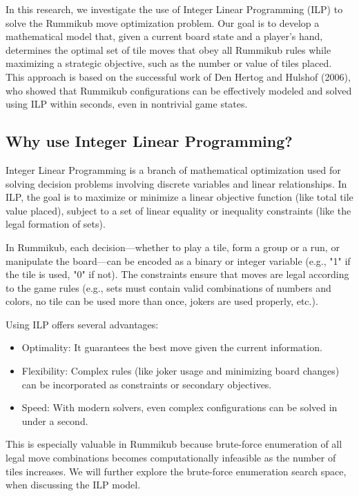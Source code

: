 \documentclass[11pt,letterpaper]{article}
\begin{document}
In this research, we investigate the use of Integer Linear Programming (ILP) to solve the 
Rummikub move optimization problem. Our goal is to develop a mathematical model that, given 
a current board state and a player's hand, determines the optimal set of tile moves that 
obey all Rummikub rules while maximizing a strategic objective, such as the number or 
value of tiles placed. This approach is based on the successful work of Den Hertog and 
Hulshof (2006), who showed that Rummikub configurations can be effectively modeled and 
solved using ILP within seconds, even in nontrivial game states.

\subsection*{Why use Integer Linear Programming?}
Integer Linear Programming is a branch of mathematical optimization used for solving decision
problems involving discrete variables and linear relationships. In ILP, the goal is to 
maximize or minimize a linear objective function (like total tile value placed), subject 
to a set of linear equality or inequality constraints (like the legal formation of sets).

In Rummikub, each decision—whether to play a tile, form a group or a run, or manipulate the 
board—can be encoded as a binary or integer variable (e.g., "1" if the tile is used, "0" if 
not). The constraints ensure that moves are legal according to the game rules (e.g., sets 
must contain valid combinations of numbers and colors, no tile can be used more than once, 
jokers are used properly, etc.).

Using ILP offers several advantages:
\begin{itemize}
    \item Optimality: It guarantees the best move given the current information.

    \item Flexibility: Complex rules (like joker usage and minimizing board changes) can be incorporated as constraints or secondary objectives.

    \item Speed: With modern solvers, even complex configurations can be solved in under a second.

\end{itemize}
This is especially valuable in Rummikub because brute-force enumeration of all legal move 
combinations becomes computationally infeasible as the number of tiles increases. We will further
explore the brute-force enumeration search space, when discussing the ILP model.
\end{document}
